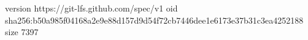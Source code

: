 version https://git-lfs.github.com/spec/v1
oid sha256:b50a985f04168a2e9e88d157d9d54f72cb7446dee1e6173e37b31c3ea4252188
size 7397
